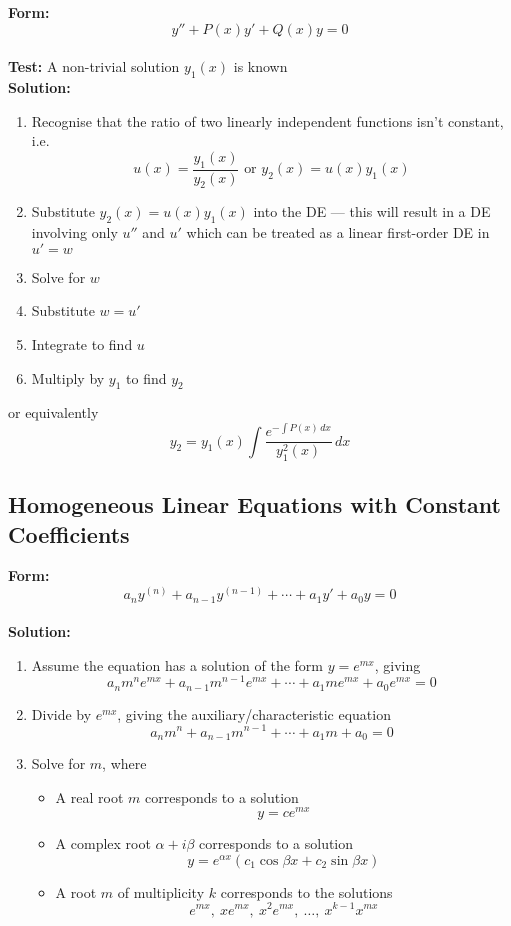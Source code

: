 \documentclass{article}
\begin{document}
\textbf{Form:} \[y'' + P(x) y' + Q(x) y = 0\] \\ \textbf{Test:} A non-trivial solution $y_1(x)$ is known \\ \textbf{Solution:} \begin{enumerate}
  \item Recognise that the ratio of two linearly independent functions isn't constant, i.e. \[u(x) = \frac{y_1(x)}{y_2(x)} \text{ or } y_2(x) = u(x) y_1(x)\]

  \item Substitute $y_2(x) = u(x) y_1(x)$ into the DE — this will result in a DE involving only $u''$ and $u'$ which can be treated as a linear first-order DE in $u' = w$

  \item Solve for $w$

  \item Substitute $w = u'$

  \item Integrate to find $u$

  \item Multiply by $y_1$ to find $y_2$
\end{enumerate} or equivalently \[y_2 = y_1(x) \int \frac{e^{-\int P(x) \,dx}}{y_1^2(x)} \,dx\]

\subsection{Homogeneous Linear Equations with Constant Coefficients}

\textbf{Form:} \[a_n y^{(n)} + a_{n - 1} y^{(n - 1)} + \cdots + a_1 y' + a_0 y = 0\] \\ \textbf{Solution:} \begin{enumerate}
  \item Assume the equation has a solution of the form $y = e^{mx}$, giving \[a_n m^n e^{mx} + a_{n - 1} m^{n - 1} e^{mx} + \cdots + a_1 m e^{mx} + a_0 e^{mx} = 0\]

  \item Divide by $e^{mx}$, giving the auxiliary/characteristic equation \[a_n m^n + a_{n - 1} m^{n - 1} + \cdots + a_1 m + a_0 = 0\]

  \item Solve for $m$, where

        \begin{itemize}
          \item A real root $m$ corresponds to a solution \[y = ce^{mx}\]

          \item A complex root $\alpha + i \beta$ corresponds to a solution \[y = e^{\alpha x} (c_1 \cos \beta x + c_2 \sin \beta x)\]

          \item A root $m$ of multiplicity $k$ corresponds to the solutions \[e^{mx}, \: x e^{mx}, \: x^2 e^{mx}, \: \ldots, \: x^{k - 1} x^{mx}\]
        \end{itemize}
\end{enumerate}
\end{document}
